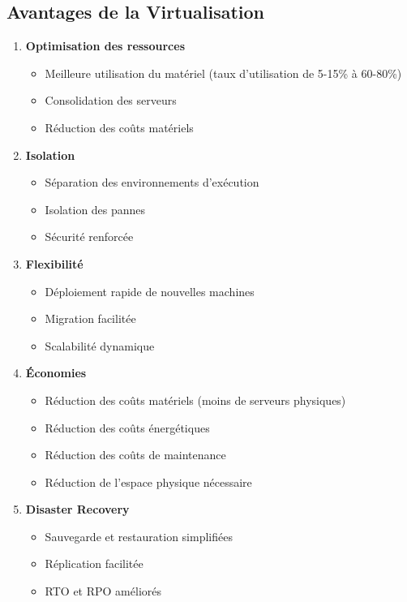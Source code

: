 \documentclass[11pt,a4paper]{article}
\begin{document}
\subsection{Avantages de la Virtualisation}

\begin{enumerate}
    \item \textbf{Optimisation des ressources}
    \begin{itemize}
        \item Meilleure utilisation du matériel (taux d'utilisation de 5-15\% à 60-80\%)
        \item Consolidation des serveurs
        \item Réduction des coûts matériels
    \end{itemize}
    
    \item \textbf{Isolation}
    \begin{itemize}
        \item Séparation des environnements d'exécution
        \item Isolation des pannes
        \item Sécurité renforcée
    \end{itemize}
    
    \item \textbf{Flexibilité}
    \begin{itemize}
        \item Déploiement rapide de nouvelles machines
        \item Migration facilitée
        \item Scalabilité dynamique
    \end{itemize}
    
    \item \textbf{Économies}
    \begin{itemize}
        \item Réduction des coûts matériels (moins de serveurs physiques)
        \item Réduction des coûts énergétiques
        \item Réduction des coûts de maintenance
        \item Réduction de l'espace physique nécessaire
    \end{itemize}
    
    \item \textbf{Disaster Recovery}
    \begin{itemize}
        \item Sauvegarde et restauration simplifiées
        \item Réplication facilitée
        \item RTO et RPO améliorés
    \end{itemize}
    

\end{enumerate}
\end{document}
